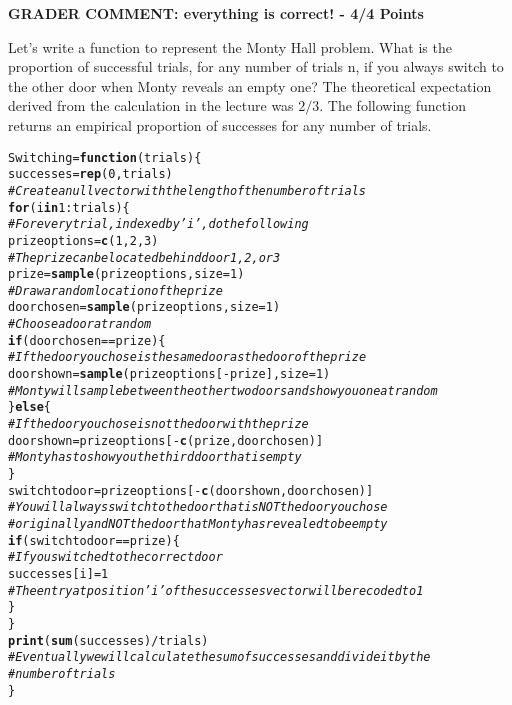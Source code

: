 \documentclass[12pt,letter]{article}\usepackage[]{graphicx}\usepackage[]{color}
\makeatletter
\newcommand{\hlnum}[1]{\textcolor[rgb]{0.686,0.059,0.569}{#1}}%
\newcommand{\hlcom}[1]{\textcolor[rgb]{0.678,0.584,0.686}{\textit{#1}}}%
\newcommand{\hlopt}[1]{\textcolor[rgb]{0,0,0}{#1}}%
\newcommand{\hlstd}[1]{\textcolor[rgb]{0.345,0.345,0.345}{#1}}%
\newcommand{\hlkwa}[1]{\textcolor[rgb]{0.161,0.373,0.58}{\textbf{#1}}}%
\newcommand{\hlkwb}[1]{\textcolor[rgb]{0.69,0.353,0.396}{#1}}%
\newcommand{\hlkwc}[1]{\textcolor[rgb]{0.333,0.667,0.333}{#1}}%
\newcommand{\hlkwd}[1]{\textcolor[rgb]{0.737,0.353,0.396}{\textbf{#1}}}%
\newenvironment{kframe}{%
 \def\at@end@of@kframe{}%
 \ifinner\ifhmode%
  \def\at@end@of@kframe{\end{minipage}}%
  \begin{minipage}{\columnwidth}%
 \fi\fi%
 \def\FrameCommand##1{\hskip\@totalleftmargin \hskip-\fboxsep
 \colorbox{shadecolor}{##1}\hskip-\fboxsep
     \hskip-\linewidth \hskip-\@totalleftmargin \hskip\columnwidth}%
 \MakeFramed {\advance\hsize-\width
   \@totalleftmargin\z@ \linewidth\hsize
   \@setminipage}}%
 {\par\unskip\endMakeFramed%
 \at@end@of@kframe}
\newenvironment{knitrout}{}{} %
\makeatother
\begin{document}
\textbf{\color{red} GRADER COMMENT: everything is correct! - 4/4 Points}

Let's write a function to represent the Monty Hall problem. What is the proportion of successful trials, for any number of trials n, if you always switch to the other door when Monty reveals an empty one? The theoretical expectation derived from the calculation in the lecture was $2/3$. The following function returns an empirical proportion of successes for any number of trials.

\begin{knitrout}
\color{fgcolor}\begin{kframe}
\begin{alltt}
\hlstd{Switching} \hlkwb{=} \hlkwa{function}\hlstd{(}\hlkwc{trials}\hlstd{) \{}
    \hlstd{successes} \hlkwb{=} \hlkwd{rep}\hlstd{(}\hlnum{0}\hlstd{, trials)}
    \hlcom{# Create a null vector with the length of the number of trials}
    \hlkwa{for} \hlstd{(i} \hlkwa{in} \hlnum{1}\hlopt{:}\hlstd{trials) \{}
        \hlcom{# For every trial, indexed by 'i', do the following}
        \hlstd{prizeoptions} \hlkwb{=} \hlkwd{c}\hlstd{(}\hlnum{1}\hlstd{,} \hlnum{2}\hlstd{,} \hlnum{3}\hlstd{)}
        \hlcom{# The prize can be located behind door 1, 2, or 3}
        \hlstd{prize} \hlkwb{=} \hlkwd{sample}\hlstd{(prizeoptions,} \hlkwc{size} \hlstd{=} \hlnum{1}\hlstd{)}
        \hlcom{# Draw a random location of the prize}
        \hlstd{doorchosen} \hlkwb{=} \hlkwd{sample}\hlstd{(prizeoptions,} \hlkwc{size} \hlstd{=} \hlnum{1}\hlstd{)}
        \hlcom{# Choose a door at random}
        \hlkwa{if} \hlstd{(doorchosen} \hlopt{==} \hlstd{prize) \{}
            \hlcom{# If the door you chose is the same door as the door of the prize}
            \hlstd{doorshown} \hlkwb{=} \hlkwd{sample}\hlstd{(prizeoptions[}\hlopt{-}\hlstd{prize],} \hlkwc{size} \hlstd{=} \hlnum{1}\hlstd{)}
            \hlcom{# Monty will sample between the other two doors and show you one at random}
        \hlstd{\}} \hlkwa{else} \hlstd{\{}
            \hlcom{# If the door you chose is not the door with the prize}
            \hlstd{doorshown} \hlkwb{=} \hlstd{prizeoptions[}\hlopt{-}\hlkwd{c}\hlstd{(prize, doorchosen)]}
            \hlcom{# Monty has to show you the third door that is empty}
        \hlstd{\}}
        \hlstd{switchtodoor} \hlkwb{=} \hlstd{prizeoptions[}\hlopt{-}\hlkwd{c}\hlstd{(doorshown, doorchosen)]}
        \hlcom{# You will always switch to the door that is NOT the door you chose}
        \hlcom{# originally and NOT the door that Monty has revealed to be empty}
        \hlkwa{if} \hlstd{(switchtodoor} \hlopt{==} \hlstd{prize) \{}
            \hlcom{# If you switched to the correct door}
            \hlstd{successes[i]} \hlkwb{=} \hlnum{1}
            \hlcom{# The entry at position 'i' of the successes vector will be recoded to 1}
        \hlstd{\}}
    \hlstd{\}}
    \hlkwd{print}\hlstd{(}\hlkwd{sum}\hlstd{(successes)}\hlopt{/}\hlstd{trials)}
    \hlcom{# Eventually we will calculate the sum of successes and divide it by the}
    \hlcom{# number of trials}
\hlstd{\}}


\end{alltt}
\end{kframe}
\end{knitrout}
\end{document}
